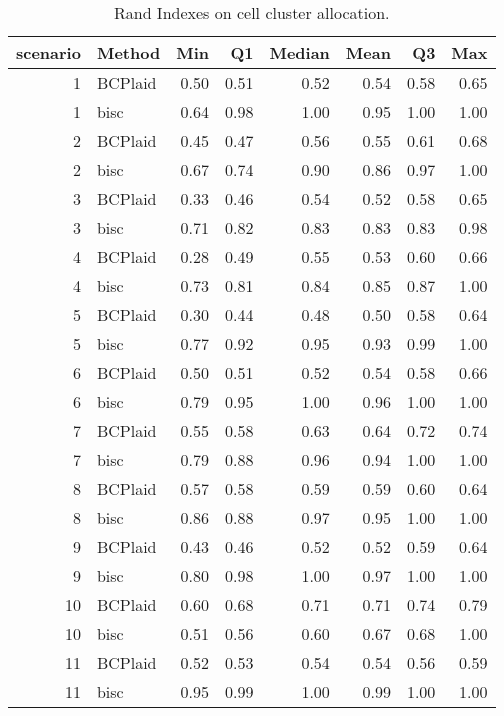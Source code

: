 \begin{table}[ht]
\caption{Rand Indexes on cell cluster allocation.}
\vspace{1.5cm}
\centering
\begin{tabular}{rlrrrrrr}
  \toprule
scenario & Method & Min & Q1 & Median & Mean & Q3 & Max \\ 
  \midrule
  1 & BCPlaid & 0.50 & 0.51 & 0.52 & 0.54 & 0.58 & 0.65 \\ 
    1 & bisc & 0.64 & 0.98 & 1.00 & 0.95 & 1.00 & 1.00 \\ 
    2 & BCPlaid & 0.45 & 0.47 & 0.56 & 0.55 & 0.61 & 0.68 \\ 
    2 & bisc & 0.67 & 0.74 & 0.90 & 0.86 & 0.97 & 1.00 \\ 
    3 & BCPlaid & 0.33 & 0.46 & 0.54 & 0.52 & 0.58 & 0.65 \\ 
    3 & bisc & 0.71 & 0.82 & 0.83 & 0.83 & 0.83 & 0.98 \\ 
    4 & BCPlaid & 0.28 & 0.49 & 0.55 & 0.53 & 0.60 & 0.66 \\ 
    4 & bisc & 0.73 & 0.81 & 0.84 & 0.85 & 0.87 & 1.00 \\ 
    5 & BCPlaid & 0.30 & 0.44 & 0.48 & 0.50 & 0.58 & 0.64 \\ 
    5 & bisc & 0.77 & 0.92 & 0.95 & 0.93 & 0.99 & 1.00 \\ 
    6 & BCPlaid & 0.50 & 0.51 & 0.52 & 0.54 & 0.58 & 0.66 \\ 
    6 & bisc & 0.79 & 0.95 & 1.00 & 0.96 & 1.00 & 1.00 \\ 
    7 & BCPlaid & 0.55 & 0.58 & 0.63 & 0.64 & 0.72 & 0.74 \\ 
    7 & bisc & 0.79 & 0.88 & 0.96 & 0.94 & 1.00 & 1.00 \\ 
    8 & BCPlaid & 0.57 & 0.58 & 0.59 & 0.59 & 0.60 & 0.64 \\ 
    8 & bisc & 0.86 & 0.88 & 0.97 & 0.95 & 1.00 & 1.00 \\ 
    9 & BCPlaid & 0.43 & 0.46 & 0.52 & 0.52 & 0.59 & 0.64 \\ 
    9 & bisc & 0.80 & 0.98 & 1.00 & 0.97 & 1.00 & 1.00 \\ 
   10 & BCPlaid & 0.60 & 0.68 & 0.71 & 0.71 & 0.74 & 0.79 \\ 
   10 & bisc & 0.51 & 0.56 & 0.60 & 0.67 & 0.68 & 1.00 \\ 
   11 & BCPlaid & 0.52 & 0.53 & 0.54 & 0.54 & 0.56 & 0.59 \\ 
   11 & bisc & 0.95 & 0.99 & 1.00 & 0.99 & 1.00 & 1.00 \\ 

\end{tabular}
\end{table}
